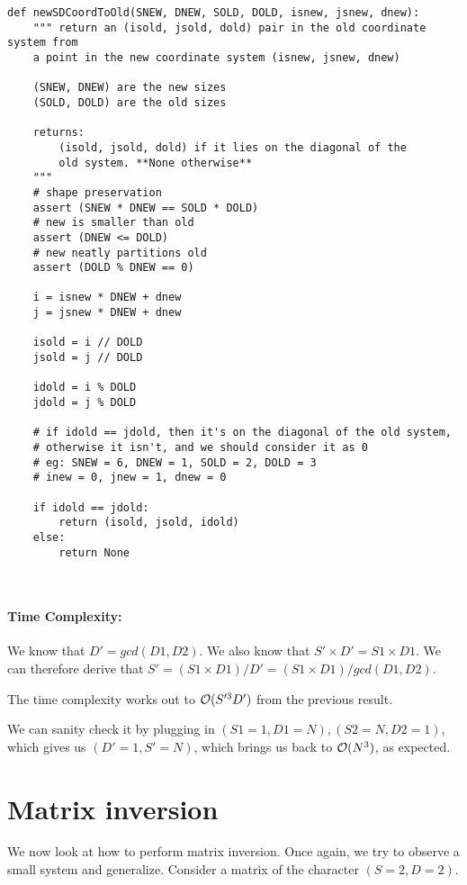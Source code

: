 \documentclass[11pt]{article}
\begin{document}
\begin{verbatim}
def newSDCoordToOld(SNEW, DNEW, SOLD, DOLD, isnew, jsnew, dnew):
    """ return an (isold, jsold, dold) pair in the old coordinate system from 
    a point in the new coordinate system (isnew, jsnew, dnew)

    (SNEW, DNEW) are the new sizes
    (SOLD, DOLD) are the old sizes

    returns:
        (isold, jsold, dold) if it lies on the diagonal of the
        old system. **None otherwise**
    """
    # shape preservation
    assert (SNEW * DNEW == SOLD * DOLD)
    # new is smaller than old
    assert (DNEW <= DOLD)
    # new neatly partitions old
    assert (DOLD % DNEW == 0)

    i = isnew * DNEW + dnew
    j = jsnew * DNEW + dnew

    isold = i // DOLD
    jsold = j // DOLD

    idold = i % DOLD
    jdold = j % DOLD

    # if idold == jdold, then it's on the diagonal of the old system,
    # otherwise it isn't, and we should consider it as 0
    # eg: SNEW = 6, DNEW = 1, SOLD = 2, DOLD = 3
    # inew = 0, jnew = 1, dnew = 0
    
    if idold == jdold:
        return (isold, jsold, idold)
    else:
        return None



\end{verbatim}
\paragraph{\textbf{Time Complexity:}}
We know that $D' = gcd(D1, D2)$. We also know that $S' \times D' = S1 \times D1$.
We can therefore derive that $S' = (S1 \times D1) / D' = (S1 \times D1) / gcd(D1, D2)$.

The time complexity works out to $\mathcal{O}(S'^3 D')$ from the previous result.

We can sanity check it by plugging in $(S1 = 1, D1 = N), (S2 = N, D2 = 1)$, which gives us
$(D' = 1, S' = N)$, which brings us back to $\mathcal{O}(N^3)$, as expected.


\section{Matrix inversion}
We now look at how to perform matrix inversion. Once again, we try to observe
a small system and generalize. Consider a matrix of the character $(S = 2, D = 2)$.
\end{document}
